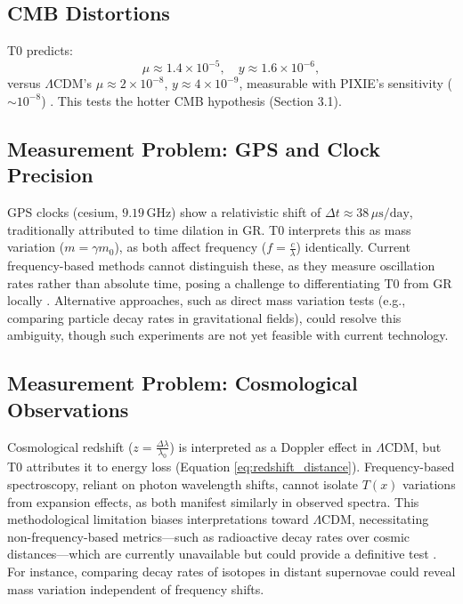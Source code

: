 \documentclass[12pt,a4paper]{article}
\newcommand{\Tfield}{T(x)}
\begin{document}
	\subsection{CMB Distortions}
	\label{subsec:cmb_distortions_test}
	
	T0 predicts:
	\begin{equation}
		\mu \approx 1.4 \times 10^{-5}, \quad y \approx 1.6 \times 10^{-6},
		\label{eq:distortion_parameters}
	\end{equation}
	versus \(\Lambda\)CDM’s \(\mu \approx 2 \times 10^{-8}\), \(y \approx 4 \times 10^{-9}\), measurable with PIXIE’s sensitivity (\(\sim 10^{-8}\)) \cite{pascher_temp_2025}. This tests the hotter CMB hypothesis (Section 3.1).
	
	\subsection{Measurement Problem: GPS and Clock Precision}
	\label{subsec:gps_clock_problem}
	
	GPS clocks (cesium, \(9.19 \, \text{GHz}\)) show a relativistic shift of \(\Delta t \approx 38 \, \mu\text{s/day}\), traditionally attributed to time dilation in GR. T0 interprets this as mass variation (\(m = \gamma m_0\)), as both affect frequency (\(f = \frac{c}{\lambda}\)) identically. Current frequency-based methods cannot distinguish these, as they measure oscillation rates rather than absolute time, posing a challenge to differentiating T0 from GR locally \cite{pascher_quantum_2025}. Alternative approaches, such as direct mass variation tests (e.g., comparing particle decay rates in gravitational fields), could resolve this ambiguity, though such experiments are not yet feasible with current technology.
	
	\subsection{Measurement Problem: Cosmological Observations}
	\label{subsec:cosmological_measurement_problem}
	
	Cosmological redshift (\(z = \frac{\Delta \lambda}{\lambda_0}\)) is interpreted as a Doppler effect in \(\Lambda\)CDM, but T0 attributes it to energy loss (Equation \ref{eq:redshift_distance}). Frequency-based spectroscopy, reliant on photon wavelength shifts, cannot isolate \(\Tfield\) variations from expansion effects, as both manifest similarly in observed spectra. This methodological limitation biases interpretations toward \(\Lambda\)CDM, necessitating non-frequency-based metrics—such as radioactive decay rates over cosmic distances—which are currently unavailable but could provide a definitive test \cite{pascher_alphabeta_2025}. For instance, comparing decay rates of isotopes in distant supernovae could reveal mass variation independent of frequency shifts.
	
\end{document}
